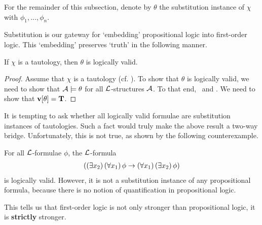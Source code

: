For the remainder of this subsection, denote by $\theta$ the substitution instance of $\chi$ with $\phi_1, \ldots, \phi_n$.

Substitution is our gateway for `embedding' propositional logic into first-order logic. This `embedding' preserves `truth' in the following manner.

\begin{boxtheorem}
    If $\chi$ is a tautology, then $\theta$ is logically valid.
\end{boxtheorem}
\begin{proof}
    Assume that $\chi$ is a tautology (cf. ). To show that $\theta$ is logically valid, we need to show that $\mathcal{A} \models \theta$ for all $\mathcal{L}$-structures $\mathcal{A}$. To that end, \ and \vola. We need to show that $\mathbf{v}\!\left[ \theta \right] = \mathbf{T}$. \sorry
\end{proof}

It is tempting to ask whether all logically valid formulae are substitution instances of tautologies. Such a fact would truly make the above result a two-way bridge. Unfortunately, this is not true, as shown by the following counterexample.

\begin{boxcexample}
    For all $\mathcal{L}$-formulae $\phi$, the $\mathcal{L}$-formula
    \begin{align*}
        \left( \left( \exists x_2 \right)\left( \forall x_1 \right)\phi \to \left( \forall x_1 \right)\left( \exists x_2 \right)\phi \right)
    \end{align*}
    is logically valid. However, it is not a substitution instance of any propositional formula, because there is no notion of quantification in propositional logic.
\end{boxcexample}

This tells us that first-order logic is not only stronger than propositional logic, it is \textbf{strictly} stronger.
